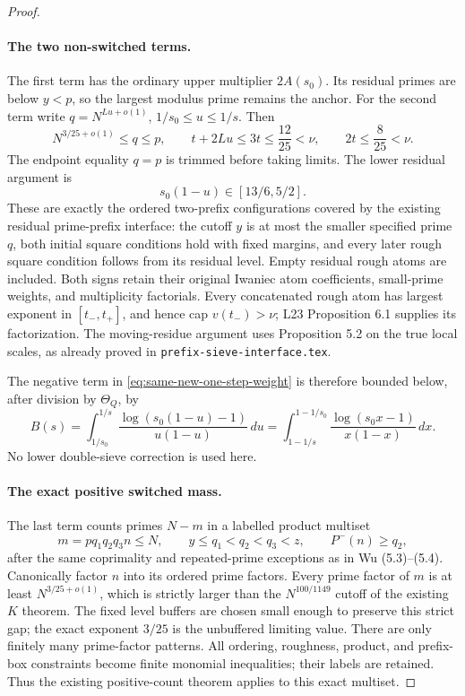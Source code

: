 \begin{proof}
\paragraph{The two non-switched terms.}
The first term has the ordinary upper multiplier $2A(s_0)$.
Its residual primes are below $y<p$, so the largest modulus prime
remains the anchor. For the second term write
$q=N^{Lu+o(1)}$, $1/s_0\le u\le1/s$. Then
\[
 N^{3/25+o(1)}\le q\le p,\qquad
 t+2Lu\le3t\le\frac{12}{25}<\nu,\qquad
 2t\le\frac8{25}<\nu.
\]
The endpoint equality $q=p$ is trimmed before taking limits.
The lower residual argument is
\[
 s_0(1-u)\in[13/6,5/2].
\]
These are exactly the ordered two-prefix configurations covered by
the existing residual prime-prefix interface: the cutoff $y$ is at
most the smaller specified prime $q$, both initial square conditions
hold with fixed margins, and every later rough square condition
follows from its residual level. Empty residual rough atoms are
included. Both signs retain their original Iwaniec atom coefficients,
small-prime weights, and multiplicity factorials. Every concatenated
rough atom has largest exponent in $[t_-,t_+]$, and hence cap
$v(t_-)> \nu$; L23 Proposition 6.1 supplies its factorization.
The moving-residue argument uses Proposition 5.2 on the true local
scales, as already proved in \texttt{prefix-sieve-interface.tex}.

The negative term in \eqref{eq:same-new-one-step-weight} is therefore
bounded below, after division by $\Theta_Q$, by
\[
 B(s)=\int_{1/s_0}^{1/s}
  \frac{\log(s_0(1-u)-1)}{u(1-u)}\,du
 =\int_{1-1/s}^{1-1/s_0}
  \frac{\log(s_0x-1)}{x(1-x)}\,dx.
\]
No lower double-sieve correction is used here.

\paragraph{The exact positive switched mass.}
The last term counts primes $N-m$ in a labelled product multiset
\[
 m=pq_1q_2q_3n\le N,\qquad
 y\le q_1<q_2<q_3<z,\qquad P^-(n)\ge q_2,
\]
after the same coprimality and repeated-prime exceptions as in
Wu (5.3)--(5.4). Canonically factor $n$ into its ordered prime factors.
Every prime factor of $m$ is at least $N^{3/25+o(1)}$, which is
strictly larger than the $N^{100/1149}$ cutoff of the existing
$K$ theorem. The fixed level buffers are chosen small enough to
preserve this strict gap; the exact exponent $3/25$ is the unbuffered
limiting value. There are only finitely many prime-factor patterns.
All ordering, roughness, product, and prefix-box constraints become
finite monomial inequalities; their labels are retained. Thus the
existing positive-count theorem applies to this exact multiset.


\end{proof}
